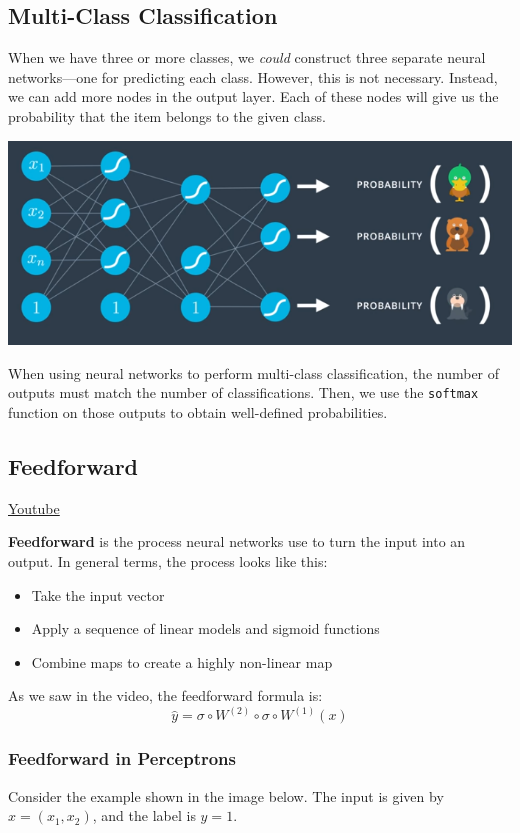 \subsection{Multi-Class Classification}
When we have three or more classes, we \textit{could} construct three separate neural networks—one for predicting each class. However, this is not necessary. Instead, we can add more nodes in the output layer. Each of these nodes will give us the probability that the item belongs to the given class.

\includegraphics[width=1\linewidth]{img//intro//introNN/neural-network-architecture-15.png}

When using neural networks to perform multi-class classification, the number of outputs must match the number of classifications. Then, we use the \lstinline|softmax| function on those outputs to obtain well-defined probabilities.

\subsection{Feedforward}
\href{https://www.youtube.com/watch?v=hVCuvMGOfyY&ab_channel=Udacity}{Youtube} \newline

\textbf{Feedforward} is the process neural networks use to turn the input into an output. In general terms, the process looks like this:

\begin{itemize}
    \item Take the input vector
    \item Apply a sequence of linear models and sigmoid functions
    \item Combine maps to create a highly non-linear map
\end{itemize}
As we saw in the video, the feedforward formula is: \[\hat{y} = \sigma \circ W^{(2)} \circ \sigma \circ W^{(1)}(x)\]

\subsubsection{Feedforward in Perceptrons}
Consider the example shown in the image below. The input is given by \(x = (x_1, x_2)\), and the label is \(y = 1\).

